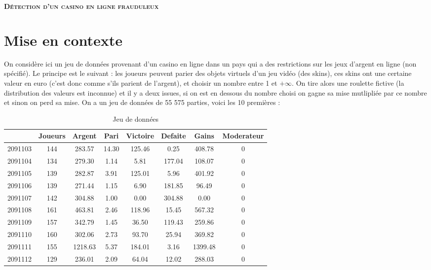 \documentclass[a4paper, 12pt]{article}
\def\Titre{Détection d'un casino en ligne frauduleux}
\theoremstyle{exo}
\begin{document}
\pagestyle{fancy}
\justifying

\begin{center}
\textsc{\bfseries\huge \Titre}
\end{center}

\tableofcontents
\listoffigures
\listoftables

\newpage

\section{Mise en contexte}

On considère ici un jeu de données provenant d'un casino en ligne dans un pays qui a des restrictions sur les jeux d'argent en ligne (non spécifié). Le principe est le suivant : les joueurs peuvent parier des objets virtuels d'un jeu vidéo (des skins), ces skins ont une certaine valeur en euro (c'est donc comme s'ils parient de l'argent), et choisir un nombre entre 1 et $+\infty$. On tire alors une roulette fictive (la distribution des valeurs est inconnue) et il y a deux issues, si on est en dessous du nombre choisi on gagne sa mise mutlipliée par ce nombre et sinon on perd sa mise. On a un jeu de données de 55 575 parties, voici les 10 premières :

\begin{table}[ht]
\centering
\begin{tabular}{cccccccc}
    \hline
    & Joueurs & Argent & Pari & Victoire & Defaite & Gains & Moderateur \\ 
    \hline
2091103 & 144 & 283.57 & 14.30 & 125.46 & 0.25 & 408.78 &   0 \\ 
    2091104 & 134 & 279.30 & 1.14 & 5.81 & 177.04 & 108.07 &   0 \\ 
    2091105 & 139 & 282.87 & 3.91 & 125.01 & 5.96 & 401.92 &   0 \\ 
    2091106 & 139 & 271.44 & 1.15 & 6.90 & 181.85 & 96.49 &   0 \\ 
    2091107 & 142 & 304.88 & 1.00 & 0.00 & 304.88 & 0.00 &   0 \\ 
    2091108 & 161 & 463.81 & 2.46 & 118.96 & 15.45 & 567.32 &   0 \\ 
    2091109 & 157 & 342.79 & 1.45 & 36.50 & 119.43 & 259.86 &   0 \\ 
    2091110 & 160 & 302.06 & 2.73 & 93.70 & 25.94 & 369.82 &   0 \\ 
    2091111 & 155 & 1218.63 & 5.37 & 184.01 & 3.16 & 1399.48 &   0 \\ 
    2091112 & 129 & 236.01 & 2.09 & 64.04 & 12.02 & 288.03 &   0 \\ 
    \hline
\end{tabular}
\caption{Jeu de données}
\end{table}
\end{document}
